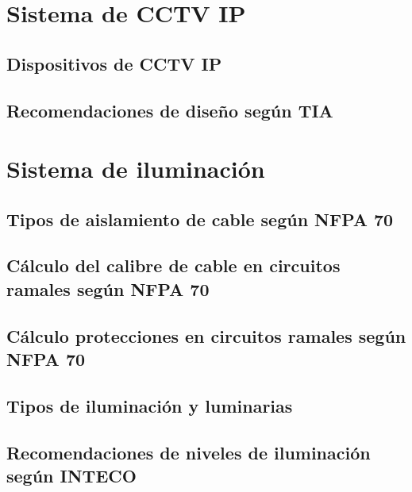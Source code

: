 \newpage


\section{Sistema de CCTV IP}


\subsection{Dispositivos de CCTV IP}

\subsection{Recomendaciones de diseño según TIA}


\newpage


\section{Sistema de iluminación}


\subsection{Tipos de aislamiento de cable según NFPA 70}

\subsection{Cálculo del calibre de cable en circuitos ramales según NFPA 70}

\subsection{Cálculo protecciones en circuitos ramales según NFPA 70}

\subsection{Tipos de iluminación y luminarias}

\subsection{Recomendaciones de niveles de iluminación según INTECO}
















